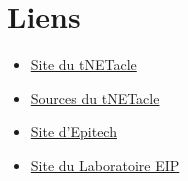 \section{Liens}

\begin{itemize}
\item \href{http://eip.epitech.eu/2013/tnetacle/tnetacle.html}{Site du tNETacle}
\item \href{https://github.com/LaKabane/tNETacle}{Sources du tNETacle}
\item \href{http://www.epitech.eu}{Site d'Epitech}
\item \href{http://eip.epitech.eu}{Site du Laboratoire EIP}
\end{itemize}
